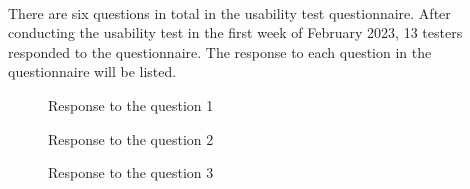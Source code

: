 \documentclass[12pt,oneside,openright,a4paper]{cpe-english-project}
\begin{document}
\\
\label{appendix:usability-test-responses} 
There are six questions in total in the usability test questionnaire. After conducting the usability test in the first week of February 2023, 13 testers responded to the questionnaire. The response to each question in the questionnaire will be listed.

\begin{figure}[!h]\centering {} \caption{Response to the question 1} \end{figure}
\begin{figure}[!h]\centering {} \caption{Response to the question 2} \end{figure}
\begin{figure}[!h]\centering {} \caption{Response to the question 3} \end{figure}
\end{document}
